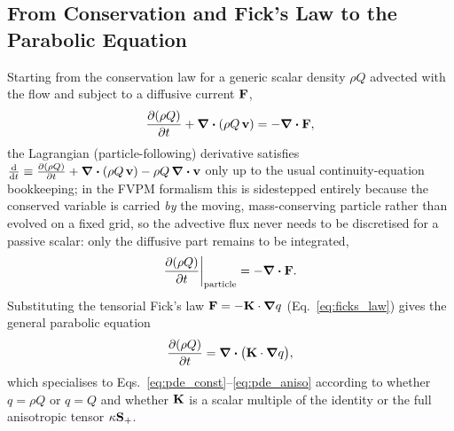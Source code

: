 \subsection{From Conservation and Fick's Law to the Parabolic Equation}
\label{app:derivation-pde}
Starting from the conservation law for a generic scalar density
$\rho Q$ advected with the flow and subject to a diffusive current
$\mathbf{F}$,
\begin{equation}
  \pdv{(\rho Q)}{t} + \div(\rho Q\,\mathbf v) = -\div\mathbf{F} ,
\end{equation}
the Lagrangian (particle-following) derivative satisfies
$\dv{}{t}(\rho Q) \equiv \pdv{(\rho Q)}{t} + \div(\rho Q\,\mathbf v) - \rho Q\,\div\mathbf v$
only up to the usual continuity-equation bookkeeping; in the FVPM
formalism this is sidestepped entirely because the conserved variable is
carried \emph{by} the moving, mass-conserving particle rather than
evolved on a fixed grid, so the advective flux never needs to be
discretised for a passive scalar: only the diffusive part remains to be
integrated,
\begin{equation}
  \pdv{(\rho Q)}{t}\bigg|_{\rm particle} = -\div\mathbf{F} .
\end{equation}
Substituting the tensorial Fick's law $\mathbf{F} = -\mathbf{K}\cdot\grad q$
(Eq.~\eqref{eq:ficks_law}) gives the general parabolic equation
\begin{equation}
  \pdv{(\rho Q)}{t} = \div\big(\mathbf{K}\cdot\grad q\big) ,
\end{equation}
which specialises to Eqs.~\eqref{eq:pde_const}--\eqref{eq:pde_aniso}
according to whether $q=\rho Q$ or $q=Q$ and whether $\mathbf{K}$ is a scalar
multiple of the identity or the full anisotropic tensor $\kappa\mathbf{S}_{+}$.

